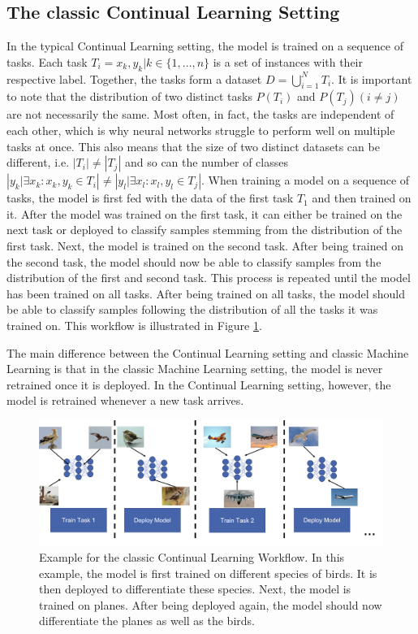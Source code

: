 \subsection{The classic Continual Learning Setting}
\label{sec:Methodology:CLSetting}
In the typical Continual Learning setting, the model is trained on a sequence of tasks. Each task $T_i = {x_k,y_k | k \in \{1,\ldots,n\}}$ is a set
of instances with their respective label. Together, the tasks form a dataset $D = \bigcup\limits_{i=1}^{N} T_i$. It is important to note that
the distribution of two distinct tasks $P(T_i)$  and $P(T_j) (i \neq j)$ are not necessarily the same. Most often, in fact, the tasks are independent
of each other, which is why neural networks struggle to perform well on multiple tasks at once. This also means that the size of two distinct datasets
can be different, i.e. $|T_i| \neq |T_j|$ and so can the number of classes $|{y_k | \exists x_k: x_k,y_k \in T_i}| \neq |{y_l | \exists x_l: x_l,y_l
\in T_j}|$. When training a model on a sequence of tasks, the model is first fed with the data of the first task $T_1$ and then trained on it. 
After the model was trained on the first task, it can either be trained on the next task or deployed to classify samples stemming from the
distribution of the first task. Next, the model is trained on the second task. After being trained on the second task, the model should now be able to
classify samples from the distribution of the first and second task. This process is repeated until the model has been trained on all
tasks. After being trained on all tasks, the model should be able to classify samples following the distribution of all the tasks it was trained on.
This workflow is illustrated in Figure \ref{fig:CLWorkflow}. \par
The main difference between the Continual Learning setting and classic Machine Learning is that in the classic Machine Learning setting, the model
is never retrained once it is deployed. In the Continual Learning setting, however, the model is retrained whenever a new task arrives.

\begin{figure}[ht]
    \centering
    \includegraphics[width=.9\linewidth]{images/CL_workflow.png}
    \caption[Continual Learning Workflow]{Example for the classic Continual Learning Workflow. In this example, the model is first trained on different species of
    birds. It is then deployed to differentiate these species. Next, the model is trained on planes. After being deployed again, the model should now differentiate
    the planes as well as the birds.}
    \label{fig:CLWorkflow}
  \end{figure}

